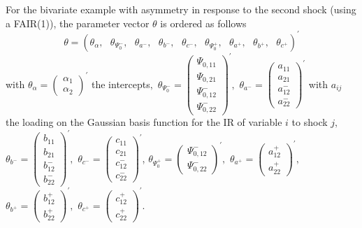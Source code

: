\documentclass[a4paper,12pt]{article}
\begin{document}
For the bivariate example with asymmetry in response to the second shock
(using a FAIR(1)), the parameter vector $\theta $ is ordered as follows%
\begin{equation}
\theta =\left( \theta _{\alpha },\text{ }\theta _{\Psi _{0}^{-}},\text{ }%
\theta _{a^{-}},\text{ }\theta _{b^{-}},\text{ }\theta _{c^{-}},\text{ }%
\theta _{\Psi _{0}^{+}},\text{ }\theta _{a^{+}},\text{ }\theta _{b^{+}},%
\text{ }\theta _{c^{+}}\right) ^{\prime }  \label{theta}
\end{equation}%
with $\theta _{\alpha }=\left( 
\begin{array}{c}
\alpha _{1} \\ 
\alpha _{2}%
\end{array}%
\right) ^{\prime }$ the intercepts$,$ $\theta _{\Psi _{0}^{-}}=\left( 
\begin{array}{c}
\Psi _{0,11} \\ 
\Psi _{0,21} \\ 
\Psi _{0,12}^{-} \\ 
\Psi _{0,22}^{-}%
\end{array}%
\right) ^{\prime },$ $\theta _{a^{-}}=\left( 
\begin{array}{c}
a_{11} \\ 
a_{21} \\ 
a_{12}^{-} \\ 
a_{22}^{-}%
\end{array}%
\right) ^{\prime }$ with $a_{ij}$ the loading on the Gaussian basis function
for the IR of variable $i$ to shock $j,$ $\theta _{b^{-}}=\left( 
\begin{array}{c}
b_{11} \\ 
b_{21} \\ 
b_{12}^{-} \\ 
b_{22}^{-}%
\end{array}%
\right) ^{\prime },$ $\theta _{c^{-}}=\left( 
\begin{array}{c}
c_{11} \\ 
c_{21} \\ 
c_{12}^{-} \\ 
c_{22}^{-}%
\end{array}%
\right) ^{\prime }$, $\theta _{\Psi _{0}^{+}}=\left( 
\begin{array}{c}
\Psi _{0,12}^{-} \\ 
\Psi _{0,22}^{-}%
\end{array}%
\right) ^{\prime },$ $\theta _{a^{+}}=\left( 
\begin{array}{c}
a_{12}^{+} \\ 
a_{22}^{+}%
\end{array}%
\right) ^{\prime },$ $\theta _{b^{+}}=\left( 
\begin{array}{c}
b_{12}^{+} \\ 
b_{22}^{+}%
\end{array}%
\right) ^{\prime },$ $\theta _{c^{+}}=\left( 
\begin{array}{c}
c_{12}^{+} \\ 
c_{22}^{+}%
\end{array}%
\right) ^{\prime }.$
\end{document}
